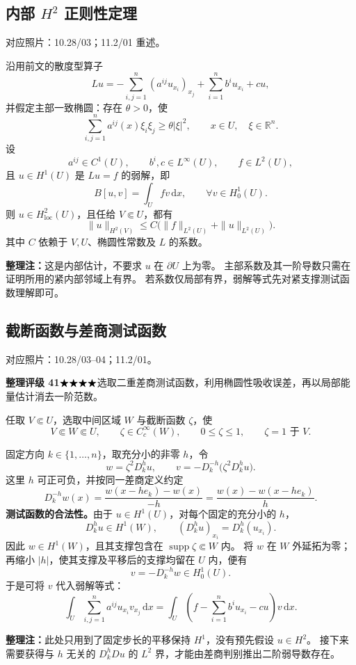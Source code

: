 \documentclass[UTF8,a4paper,11pt,fontset=fandol]{ctexart}
\newcommand{\R}{\mathbb R}
\newcommand{\dd}{\,\mathrm d}
\newcommand{\ednote}[1]{\par{\small\color{notegray}\textbf{整理注：}#1}\par}
\newcommand{\source}[1]{{\small\color{notegray}对应照片：#1。}\par}
\newcommand{\proofstars}[1]{\ensuremath{%
\ifnum#1>0\relax\bigstar\fi
\ifnum#1>1\relax\bigstar\fi
\ifnum#1>2\relax\bigstar\fi
\ifnum#1>3\relax\bigstar\fi
\ifnum#1>4\relax\bigstar\fi}}
\newcommand{\proofrating}[3]{\par{\small\color{proofblue}%
\textbf{整理评级 #1}\enspace\proofstars{#2}\quad #3\par}}
\begin{document}
\subsection{\texorpdfstring{内部 $H^2$ 正则性定理}{内部二阶正则性定理}}
\source{10.28/03；11.2/01 重述}
沿用前文的散度型算子
\[
Lu=-\sum_{i,j=1}^n(a^{ij}u_{x_i})_{x_j}
    +\sum_{i=1}^n b^iu_{x_i}+cu,
\]
并假定主部一致椭圆：存在 $\theta>0$，使
\[
\sum_{i,j=1}^n a^{ij}(x)\xi_i\xi_j\geq\theta|\xi|^2,
\qquad x\in U,\quad\xi\in\R^n.
\]
设
\[
a^{ij}\in C^1(U),\qquad b^i,c\in L^\infty(U),\qquad f\in L^2(U),
\]
且 $u\in H^1(U)$ 是 $Lu=f$ 的弱解，即
\[
B[u,v]=\int_U fv\dd x,\qquad\forall v\in H_0^1(U).
\]
则 $u\in H_{\mathrm{loc}}^2(U)$，且任给 $V\Subset U$，都有
\[
\boxed{\|u\|_{H^2(V)}\leq C\bigl(\|f\|_{L^2(U)}+\|u\|_{L^2(U)}\bigr).}
\]
其中 $C$ 依赖于 $V,U$、椭圆性常数及 $L$ 的系数。
\ednote{这是内部估计，不要求 $u$ 在 $\partial U$ 上为零。
主部系数及其一阶导数只需在证明所用的紧内部邻域上有界。
若系数仅局部有界，弱解等式先对紧支撑测试函数理解即可。}

\newpage
\subsection{截断函数与差商测试函数}
\source{10.28/03--04；11.2/01}
\proofrating{41}{4}{选取二重差商测试函数，利用椭圆性吸收误差，再以局部能量估计消去一阶范数。}
任取 $V\Subset U$，选取中间区域 $W$ 与截断函数 $\zeta$，使
\[
V\Subset W\Subset U,\qquad \zeta\in C_c^\infty(W),\qquad
0\leq\zeta\leq1,\qquad\zeta=1\text{ 于 }V.
\]
\begin{center}
\end{center}
固定方向 $k\in\{1,\ldots,n\}$，取充分小的非零 $h$，令
\[
w=\zeta^2D_k^h u,\qquad
\boxed{v=-D_k^{-h}\bigl(\zeta^2D_k^h u\bigr).}
\]
这里 $h$ 可正可负，并按同一差商定义约定
\[
D_k^{-h}w(x)=\frac{w(x-he_k)-w(x)}{-h}
             =\frac{w(x)-w(x-he_k)}{h}.
\]
\textbf{测试函数的合法性。}由于 $u\in H^1(U)$，对每个固定的充分小的 $h$，
\[
D_k^h u\in H^1(W),\qquad
(D_k^h u)_{x_i}=D_k^h(u_{x_i}).
\]
因此 $w\in H^1(W)$，且其支撑包含在 $\operatorname{supp}\zeta\Subset W$ 内。
将 $w$ 在 $W$ 外延拓为零；再缩小 $|h|$，使其支撑及平移后的支撑均留在 $U$ 内，便有
\[
v=-D_k^{-h}w\in H_0^1(U).
\]
于是可将 $v$ 代入弱解等式：
\[
\int_U\sum_{i,j=1}^n a^{ij}u_{x_i}v_{x_j}\dd x
=\int_U\left(f-\sum_{i=1}^n b^iu_{x_i}-cu\right)v\dd x.
\]
\ednote{此处只用到了固定步长的平移保持 $H^1$，没有预先假设 $u\in H^2$。
接下来需要获得与 $h$ 无关的 $D_k^h Du$ 的 $L^2$ 界，才能由差商判别推出二阶弱导数存在。}
\end{document}
